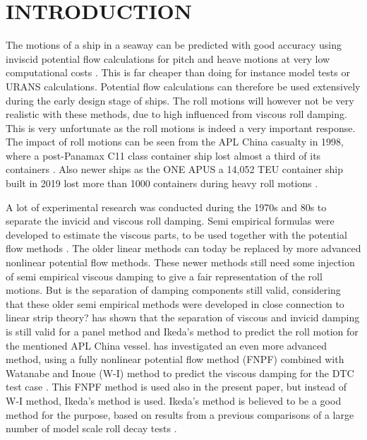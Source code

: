 \section*{INTRODUCTION}\label{introduction}

The motions of a ship in a seaway can be predicted with good accuracy
using inviscid potential flow calculations for pitch and heave motions
at very low computational costs \cite{7505983/FB64RGPF}. This is far
cheaper than doing for instance model tests or URANS calculations.
Potential flow calculations can therefore be used extensively during the
early design stage of ships. The roll motions will however not be very
realistic with these methods, due to high influenced from viscous roll
damping. This is very unfortunate as the roll motions is indeed a very
important response. The impact of roll motions can be seen from the APL
China casualty in 1998, where a post-Panamax C11 class container ship
lost almost a third of its containers \cite{7505983/WPADAQB3}. Also
newer ships as the ONE APUS a 14,052 TEU container ship built in 2019
lost more than 1000 containers during heavy roll motions
\cite{7505983/EYV6YF92}.

A lot of experimental research was conducted during the 1970s and 80s to
separate the invicid and viscous roll damping. Semi empirical formulas
were developed to estimate the viscous parts, to be used together with
the potential flow methods \cite{7505983/937PN5DT}. The older linear
methods can today be replaced by more advanced nonlinear potential flow
methods. These newer methods still need some injection of semi empirical
viscous damping to give a fair representation of the roll motions. But
is the separation of damping components still valid, considering that
these older semi empirical methods were developed in close connection to
linear strip theory? \cite{7505983/UGK6YEVD} has shown that the
separation of viscous and invicid damping is still valid for a panel
method and Ikeda's method to predict the roll motion for the mentioned
APL China vessel. \cite{7505983/24TNAV5Z} has investigated an even more
advanced method, using a fully nonlinear potential flow method (FNPF)
\cite{7505983/P4XDUMMQ} combined with Watanabe and Inoue (W-I) method
\cite{7505983/ARMIRMVY} to predict the viscous damping for the DTC test
case \cite{7505983/BYNJ8CFG}. This FNPF method is used also in the
present paper, but instead of W-I method, Ikeda's method is used.
Ikeda's method is believed to be a good method for the purpose, based on
results from a previous comparisons of a large number of model scale
roll decay tests \cite{7505983/QMGQ76Q9}.

